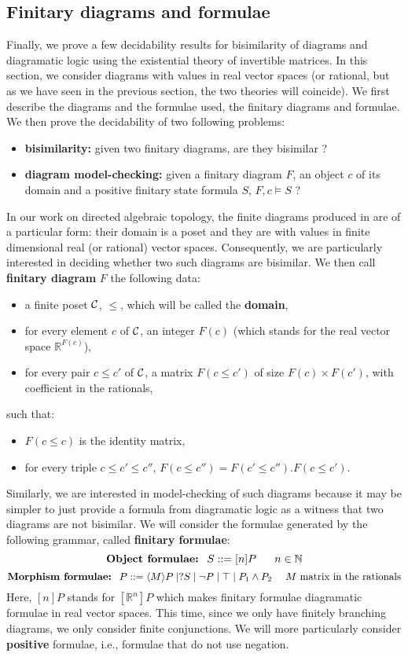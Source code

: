 \subsection{Finitary diagrams and formulae}

Finally, we prove a few decidability results for bisimilarity of diagrams and diagramatic logic using the existential theory of invertible matrices. In this section, we consider diagrams with values in real vector spaces (or rational, but as we have seen in the previous section, the two theories will coincide). We first describe the diagrams and the formulae used, the finitary diagrams and formulae. We then prove the decidability of two following problems:
\begin{itemize}
	\item \textbf{bisimilarity:} given two finitary diagrams, are they bisimilar ?
	\item \textbf{diagram model-checking:} given a finitary diagram $F$, an object $c$ of its domain and a positive finitary state formula $S$, $F,c \vDash S$ ? 
\end{itemize}



In our work on directed algebraic topology, the finite diagrams produced in \cite{dubut15} are of a particular form: their domain is a poset and they are with values in finite dimensional real (or rational) vector spaces. Consequently, we are particularly interested in deciding whether two such diagrams are bisimilar. We then call \textbf{finitary diagram} $F$ the following data:
\begin{itemize}
	\item a finite poset $\mathcal{C}$, $\leq$, which will be called the \textbf{domain},
	\item for every element $c$ of $\mathcal{C}$, an integer $F(c)$ (which stands for the real vector space $\mathbb{R}^{F(c)}$),
	\item for every pair $c \leq c'$ of $\mathcal{C}$, a matrix $F(c\leq c')$ of size $F(c)\times F(c')$, with coefficient in the rationals,
\end{itemize}
such that:
\begin{itemize}
	\item $F(c\leq c)$ is the identity matrix,
	\item for every triple $c \leq c' \leq c''$, $F(c\leq c'') = F(c'\leq c'').F(c\leq c')$.
\end{itemize}

Similarly, we are interested in model-checking of such diagrams because it may be simpler to just provide a formula from diagramatic logic as a witness that two diagrams are not bisimilar. We will consider the formulae generated by the following grammar, called \textbf{finitary formulae}:
$$\text{\textbf{Object formulae:~~}} S::=[n]P~~~~~n\in\mathbb{N}$$
$$\text{\textbf{Morphism formulae:~~}} P::=\langle M \rangle P\mid?S\mid\neg P\mid \top \mid P_1\wedge P_2~~~~M \text{ matrix in the rationals}$$
Here, $[n]P$ stands for $[\mathbb{R}^n]P$ which makes finitary formulae diagramatic formulae in real vector spaces. This time, since we only have finitely branching diagrams, we only consider finite conjunctions. We will more particularly consider \textbf{positive} formulae, i.e., formulae that do not use negation.

